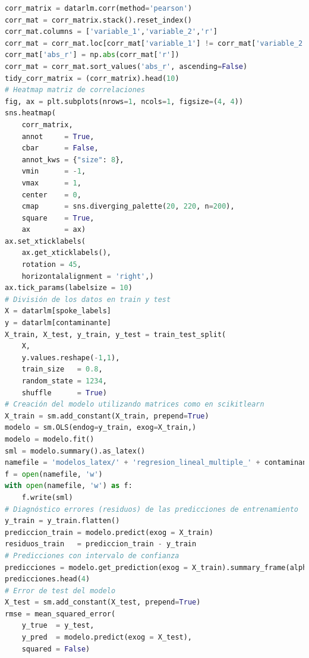 \clearpage
\begin{lstlisting}[language=Python, caption=Generación de los modelos de regresión lineal múltiple, label=lst:c5]
corr_matrix = datarlm.corr(method='pearson')
corr_mat = corr_matrix.stack().reset_index()
corr_mat.columns = ['variable_1','variable_2','r']
corr_mat = corr_mat.loc[corr_mat['variable_1'] != corr_mat['variable_2'], :]
corr_mat['abs_r'] = np.abs(corr_mat['r'])
corr_mat = corr_mat.sort_values('abs_r', ascending=False)
tidy_corr_matrix = (corr_matrix).head(10)
# Heatmap matriz de correlaciones
fig, ax = plt.subplots(nrows=1, ncols=1, figsize=(4, 4))
sns.heatmap(
    corr_matrix,
    annot     = True,
    cbar      = False,
    annot_kws = {"size": 8},
    vmin      = -1,
    vmax      = 1,
    center    = 0,
    cmap      = sns.diverging_palette(20, 220, n=200),
    square    = True,
    ax        = ax)
ax.set_xticklabels(
    ax.get_xticklabels(),
    rotation = 45,
    horizontalalignment = 'right',)
ax.tick_params(labelsize = 10)
# División de los datos en train y test
X = datarlm[spoke_labels]
y = datarlm[contaminante]
X_train, X_test, y_train, y_test = train_test_split(
    X,
    y.values.reshape(-1,1),
    train_size   = 0.8,
    random_state = 1234,
    shuffle      = True)
# Creación del modelo utilizando matrices como en scikitlearn
X_train = sm.add_constant(X_train, prepend=True)
modelo = sm.OLS(endog=y_train, exog=X_train,)
modelo = modelo.fit()
sml = modelo.summary().as_latex()
namefile = 'modelos_latex/' + 'regresion_lineal_multiple_' + contaminante + '_' + año + '.tex'
f = open(namefile, 'w')
with open(namefile, 'w') as f:
    f.write(sml)
# Diagnóstico errores (residuos) de las predicciones de entrenamiento
y_train = y_train.flatten()
prediccion_train = modelo.predict(exog = X_train)
residuos_train   = prediccion_train - y_train
# Predicciones con intervalo de confianza 
predicciones = modelo.get_prediction(exog = X_train).summary_frame(alpha=0.05)
predicciones.head(4)
# Error de test del modelo 
X_test = sm.add_constant(X_test, prepend=True)
rmse = mean_squared_error(
    y_true  = y_test,
    y_pred  = modelo.predict(exog = X_test),
    squared = False)
\end{lstlisting}
